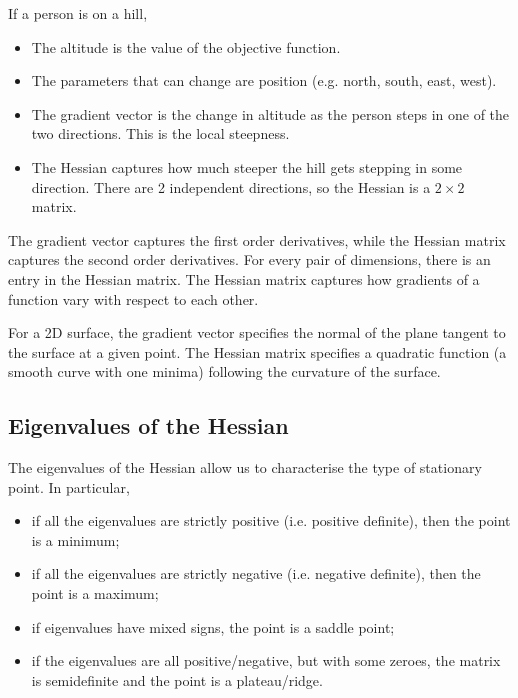 \documentclass[a4paper, openany]{memoir}
\begin{document}
If a person is on a hill,
\begin{itemize}
    \item The altitude is the value of the objective function.
    \item The parameters that can change are position (e.g. north, south, east, west).
    \item The gradient vector is the change in altitude as the person steps in one of the two directions. This is the local steepness.
    \item The Hessian captures how much steeper the hill gets stepping in some direction. There are 2 independent directions, so the Hessian is a $2 \times 2$ matrix.
\end{itemize}

The gradient vector captures the first order derivatives, while the Hessian matrix captures the second order derivatives. For every pair of dimensions, there is an entry in the Hessian matrix. The Hessian matrix captures how gradients of a function vary with respect to each other.

For a 2D surface, the gradient vector specifies the normal of the plane tangent to the surface at a given point. The Hessian matrix specifies a quadratic function (a smooth curve with one minima) following the curvature of the surface.

\subsection{Eigenvalues of the Hessian}
The eigenvalues of the Hessian allow us to characterise the type of stationary point. In particular,
\begin{itemize}
    \item if all the eigenvalues are strictly positive (i.e. positive definite), then the point is a minimum;
    \item if all the eigenvalues are strictly negative (i.e. negative definite), then the point is a maximum;
    \item if eigenvalues have mixed signs, the point is a saddle point;
    \item if the eigenvalues are all positive/negative, but with some zeroes, the matrix is semidefinite and the point is a plateau/ridge.
\end{itemize}
\end{document}
